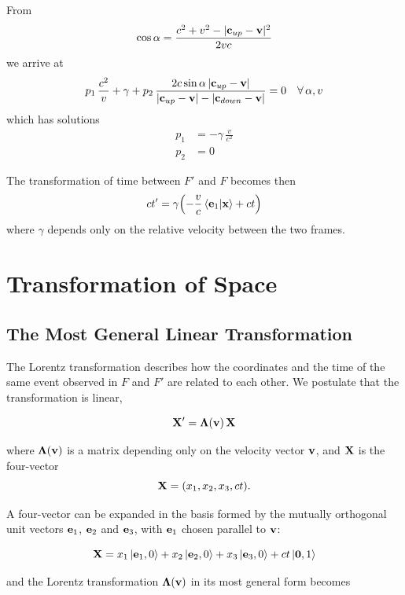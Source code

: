 \documentclass[12pt]{article}
\begin{document}
From
\[
  \cos\alpha = \frac{c^2 + v^2 - |\vb{c}_{up} - \vb{v}|^2}{2vc}
\]
we arrive at
\[
  p_1\,\frac{c^2}{v} + \gamma
  + p_2\,\frac{2c\sin\alpha\,|\vb{c}_{up} - \vb{v}|}{|\vb{c}_{up} - \vb{v}| - |\vb{c}_{down} - \vb{v}|}
  = 0 \quad \forall\, \alpha, v
\]
which has solutions
\begin{align}
  p_1 &= -\gamma\,\frac{v}{c^2} \\
  p_2 &= 0
\end{align}

The transformation of time between $F'$ and $F$ becomes then
\begin{equation}
  ct' = \gamma\!\left(-\frac{v}{c}\ip{\vb{e}_1}{\vb{x}} + ct\right)
  \label{eq:transformation_of_time}
\end{equation}
where $\gamma$ depends only on the relative velocity between the two frames.

\section{Transformation of Space}

\subsection{The Most General Linear Transformation}

The Lorentz transformation describes how the coordinates and the time of the same event
observed in $F$ and $F'$ are related to each other. We postulate that the transformation is linear,

\[
  \vb{X}' = \boldsymbol{\Lambda}(\vb{v})\,\vb{X}
\]

where $\boldsymbol{\Lambda}(\vb{v})$ is a matrix depending only on the velocity vector
$\vb{v}$, and $\vb{X}$ is the four-vector
\[
  \vb{X} = (x_1, x_2, x_3, ct).
\]

A four-vector can be expanded in the basis formed by the mutually
orthogonal unit vectors $\vb{e}_1$, $\vb{e}_2$ and $\vb{e}_3$, with $\vb{e}_1$ chosen parallel to
$\vb{v}$:

\[
  \vb{X} = x_1\ket{\vb{e}_1, 0} + x_2\ket{\vb{e}_2, 0} + x_3\ket{\vb{e}_3, 0}
           + ct\ket{\vb{0}, 1}
\]

and the Lorentz transformation $\boldsymbol{\Lambda}(\vb{v})$ in its most general form
becomes
\end{document}

